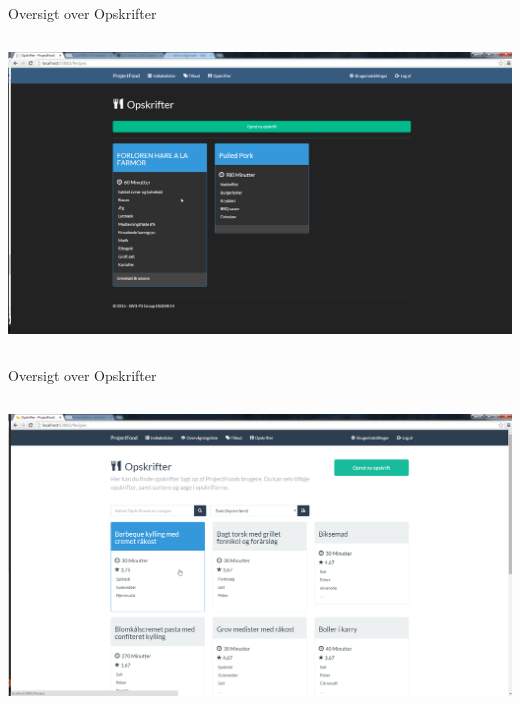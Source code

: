 \begin{frame}{Oversigt over Opskrifter}

	
	\begin{minipage}[0.3\textheight]{\textwidth}
	\begin{columns}[T]
	\begin{column}{1\textwidth}
	 \includegraphics[width=1\textwidth,height=1\textheight,keepaspectratio, trim={1cm 0 0 16mm}, clip]{images/Screenshots/RecipeOld.png}
	
	\end{column}

	\end{columns}

  \end{minipage}
	
\end{frame}

\begin{frame}{Oversigt over Opskrifter}

	
	\begin{minipage}[0.3\textheight]{\textwidth}
	\begin{columns}[T]
	\begin{column}{1\textwidth}
	 \includegraphics[width=1\textwidth,height=1\textheight,keepaspectratio, trim={1cm 0 0 16mm}, clip]{images/Screenshots/Recipe.png}
	
	\end{column}

	\end{columns}

  \end{minipage}
	
\end{frame}

